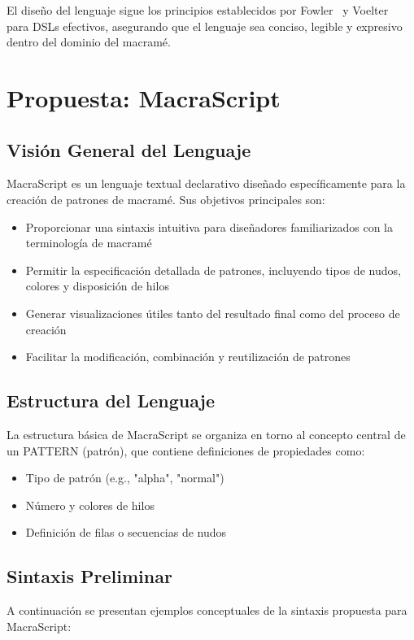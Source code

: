 \documentclass[12pt,a4paper]{report}
\begin{document}
El diseño del lenguaje sigue los principios establecidos por Fowler~\cite{fowler2010} y Voelter~\cite{voelter2013} para DSLs efectivos, asegurando que el lenguaje sea conciso, legible y expresivo dentro del dominio del macramé.

\chapter{Propuesta: MacraScript}

\section{Visión General del Lenguaje}
MacraScript es un lenguaje textual declarativo diseñado específicamente para la creación de patrones de macramé. Sus objetivos principales son:

\begin{itemize}
    \item Proporcionar una sintaxis intuitiva para diseñadores familiarizados con la terminología de macramé
    \item Permitir la especificación detallada de patrones, incluyendo tipos de nudos, colores y disposición de hilos
    \item Generar visualizaciones útiles tanto del resultado final como del proceso de creación
    \item Facilitar la modificación, combinación y reutilización de patrones~\cite{voelter2013}
\end{itemize}

\section{Estructura del Lenguaje}
La estructura básica de MacraScript se organiza en torno al concepto central de un PATTERN (patrón), que contiene definiciones de propiedades como:

\begin{itemize}
    \item Tipo de patrón (e.g., "alpha", "normal")
    \item Número y colores de hilos
    \item Definición de filas o secuencias de nudos
\end{itemize}

\section{Sintaxis Preliminar}
A continuación se presentan ejemplos conceptuales de la sintaxis propuesta para MacraScript:
\end{document}
